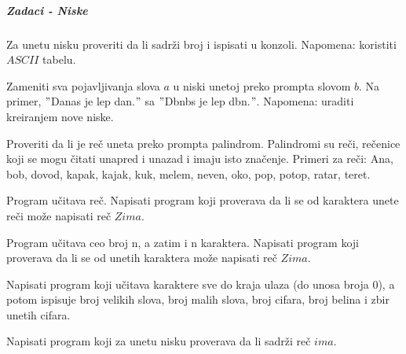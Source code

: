 \subparagraph{Zadaci - Niske}
\begin{primer}
Za unetu nisku proveriti da li sadrži broj i ispisati u konzoli. Napomena: koristiti $ASCII$ tabelu.
\end{primer}

\begin{primer}
Zameniti sva pojavljivanja slova $a$ u niski unetoj preko prompta slovom $b$. Na primer, $"$Danas je lep dan.$"$ sa $"$Dbnbs je lep dbn.$"$. Napomena: uraditi kreiranjem nove niske.
\end{primer}

\begin{primer}
Proveriti da li je reč uneta preko prompta palindrom. Palindromi su reči, rečenice koji se mogu čitati unapred i unazad i imaju isto značenje. Primeri za reči: Ana, bob, dovod, kapak, kajak, kuk, melem, neven, oko, pop, potop, ratar, teret. 
\end{primer}

\begin{primer}
Program učitava reč. Napisati
program koji proverava da li se od karaktera unete reči može napisati reč $Zima$.
\end{primer}

\begin{primer}
Program učitava ceo broj n, a zatim i n karaktera. Napisati
program koji proverava da li se od unetih karaktera može napisati reč $Zima$.
\end{primer}

\begin{primer}
Napisati program koji učitava karaktere sve do kraja ulaza (do unosa broja 0), a potom ispisuje broj velikih slova, broj malih slova, broj cifara, broj belina i zbir unetih cifara. 
\end{primer}

\begin{primer}
Napisati program koji za unetu nisku proverava da li sadrži reč $ima$.
\end{primer}

